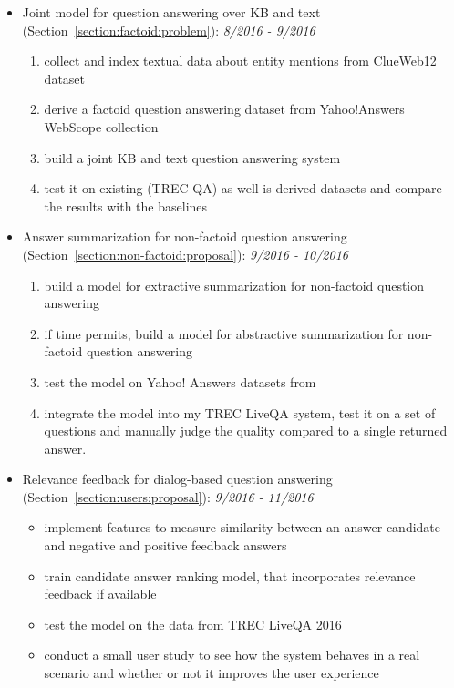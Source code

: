 \begin{itemize}
\item Joint model for question answering over KB and text (Section~\ref{section:factoid:problem}): \textit{8/2016 - 9/2016}
	\begin{enumerate}
	\item collect and index textual data about entity mentions from ClueWeb12 dataset
	\item derive a factoid question answering dataset from Yahoo!Answers WebScope collection
	\item build a joint KB and text question answering system
	\item test it on existing (TREC QA) as well is derived datasets and compare the results with the baselines
	\end{enumerate}
	
\item Answer summarization for non-factoid question answering (Section~\ref{section:non-factoid:proposal}): \textit{9/2016 - 10/2016}
	\begin{enumerate}
	\item build a model for extractive summarization for non-factoid question answering
	\item if time permits, build a model for abstractive summarization for non-factoid question answering
	\item test the model on Yahoo! Answers datasets from~\cite{omari2016novelty,tomasoni2010metadata}
	\item integrate the model into my TREC LiveQA system, test it on a set of questions and manually judge the quality compared to a single returned answer.
	\end{enumerate}

\item Relevance feedback for dialog-based question answering (Section~\ref{section:users:proposal}): \textit{9/2016 - 11/2016}
	\begin{itemize}
	\item implement features to measure similarity between an answer candidate and negative and positive feedback answers
	\item train candidate answer ranking model, that incorporates relevance feedback if available
	\item test the model on the data from TREC LiveQA 2016
	\item conduct a small user study to see how the system behaves in a real scenario and whether or not it improves the user experience
	\end{itemize}


\end{itemize}
